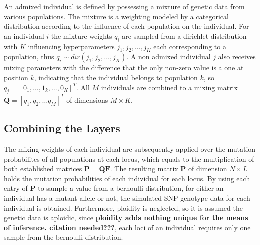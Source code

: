 \documentclass[a4paper, 11pt]{article}
\begin{document}
An admixed individual is defined by possessing a mixture of genetic data from various populations. The mixture is a weighting modeled by a categorical distribution according to the influence of each population on the individual. For an individual $i$ the mixture weights $q_i$ are sampled from a dirichlet distribution with $K$ influencing hyperparameters $j_1, j_2, \ldots, j_K$ each corresponding to a population, thus $q_i \sim dir(j_1, j_2, \ldots, j_K)$. A non admixed individual $j$ also receives mixing parameters with the difference that the only non-zero value is a one at position $k$, indicating that the individual belongs to population $k$, so $q_j = [0_1, \ldots, 1_k, \ldots, 0_K]^T$. All $M$ individuals are combined to a mixing matrix $\mathbf{Q} = [q_1,q_2, \ldots q_M]^T$ of dimensions $M \times K$. \\

\subsection{Combining the Layers}

The mixing weights of each individual are subsequently applied over the mutation probabilites of all populations at each locus, which equals to the multiplication of both established matrices $\mathbf{P} = \mathbf{Q}\mathbf{F}$. The resulting matrix $\mathbf{P}$ of dimension $N \times L$ holds the mutation probabilities of each individual for each locus. By using each entry of $\mathbf{P}$ to sample a value from a bernoulli distribution, for either an individual has a mutant allele or not, the simulated SNP genotype data for each individual is obtained. Furthermore, ploidity is neglected, so it is assumed the genetic data is aploidic, since \textbf{ploidity adds nothing unique for the means of inference. citation needed???}, each loci of an individual requires only one sample from the bernoulli distribution.\\
\end{document}
